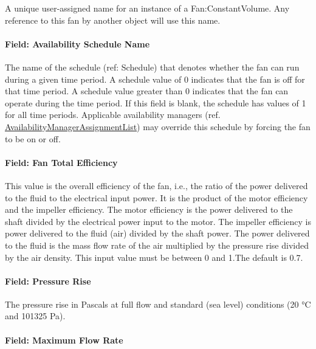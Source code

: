 A unique user-assigned name for an instance of a Fan:ConstantVolume. Any reference to this fan by another object will use this name.

\paragraph{Field: Availability Schedule Name}\label{field-availability-schedule-name-007}

The name of the schedule (ref: Schedule) that denotes whether the fan can run during a given time period. A schedule value of 0 indicates that the fan is off for that time period. A schedule value greater than 0 indicates that the fan can operate during the time period. If this field is blank, the schedule has values of 1 for all time periods. Applicable availability managers (ref. \hyperref[availabilitymanagerassignmentlist]{AvailabilityManagerAssignmentList}) may override this schedule by forcing the fan to be on or off.

\paragraph{Field: Fan Total Efficiency}\label{field-fan-total-efficiency-000}

This value is the overall efficiency of the fan, i.e., the ratio of the power delivered to the fluid to the electrical input power. It is the product of the motor efficiency and the impeller efficiency. The motor efficiency is the power delivered to the shaft divided by the electrical power input to the motor. The impeller efficiency is power delivered to the fluid (air) divided by the shaft power. The power delivered to the fluid is the mass flow rate of the air multiplied by the pressure rise divided by the air density. This input value must be between 0 and 1.The default is 0.7.

\paragraph{Field: Pressure Rise}\label{field-pressure-rise}

The pressure rise in Pascals at full flow and standard (sea level) conditions (20 °C and 101325 Pa).

\paragraph{Field: Maximum Flow Rate}\label{field-maximum-flow-rate-000}

